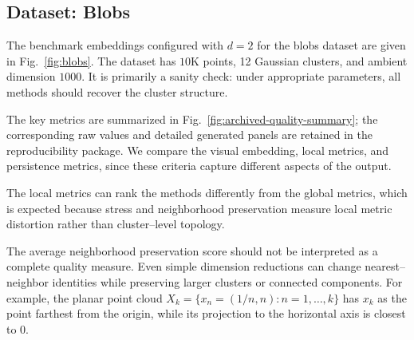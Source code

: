 \documentclass[11pt]{article}
\begin{document}
\begin{table}[tbp]
  \centering
  \resizebox{\textwidth}{!}{%
    }
  \caption{arXiv paired Betti--DTW effects under the retained unit--diameter
  protocol and the separately labelled Q99 scale sensitivity. The gap is
  comparator minus production--policy DiRe, so a positive gap favours DiRe.
  Each topology subset is one independently seeded set of $m=4000$ row indices
  applied identically to the high--dimensional reference and every embedding.
  The final column reports every subset--specific paired gap in fixed seed
  order rather than reducing the signs to a count.}
  \label{tab:revision3-arxiv-topology-effects}
\end{table}

\subsection{Dataset: Blobs}

The benchmark embeddings configured with $d=2$ for the blobs dataset are given in Fig.~\ref{fig:blobs}. The dataset has $10$K points, 12 Gaussian clusters, and ambient dimension $1000$. It is primarily a sanity check: under appropriate parameters, all methods should recover the cluster structure.

The key metrics are summarized in
Fig.~\ref{fig:archived-quality-summary}; the corresponding raw values and
detailed generated panels are retained in the reproducibility package. We
compare the visual embedding, local metrics, and persistence metrics, since
these criteria capture different aspects of the output.

The local metrics can rank the methods differently from the global metrics, which is expected because stress and neighborhood preservation measure local metric distortion rather than cluster--level topology.

The average neighborhood preservation score should not be interpreted as a complete quality measure. Even simple dimension reductions can change nearest--neighbor identities while preserving larger clusters or connected components. For example, the planar point cloud $X_k = \{x_n = (1/n, n) : n=1,\ldots,k\}$ has $x_k$ as the point farthest from the origin, while its projection to the horizontal axis is closest to $0$.
\end{document}
